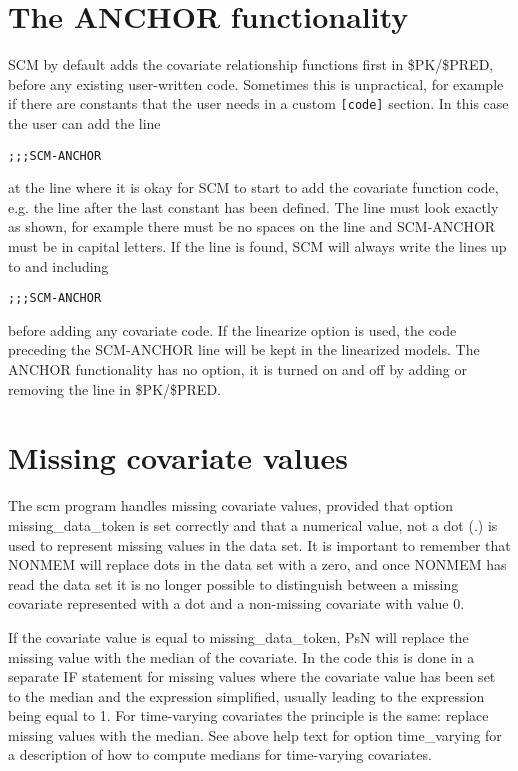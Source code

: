 \section{The ANCHOR functionality}
SCM by default adds the covariate relationship functions first in \$PK/\$PRED, before any existing user-written code. Sometimes this is unpractical, for example if there are constants that the user needs in a custom 
\verb|[code]| section. In this case the user can add the line
\begin{verbatim}
;;;SCM-ANCHOR
\end{verbatim}
at the line where it is okay for SCM to start to add the covariate function code, e.g. the line after the last constant has been defined. The line must look exactly as shown, for example there must be no spaces on the line and SCM-ANCHOR must be in capital letters. If the line is found, SCM will always write the lines up to and including 
\begin{verbatim}
;;;SCM-ANCHOR
\end{verbatim}
before adding any covariate code. If the linearize option is used, the code preceding the SCM-ANCHOR line will be kept in the linearized models. The ANCHOR functionality has no option, it is turned on and off by adding or removing the line in \$PK/\$PRED.

\section{Missing covariate values}
The scm program handles missing covariate values, provided that option missing\_data\_token is set correctly and that a numerical value, not a dot (.) is
used to represent missing values in the data set. It is important to remember that NONMEM will replace dots in the data set with a zero, and once NONMEM
has read the data set it is no longer possible to distinguish between
a missing covariate represented with a dot and a 
non-missing covariate with value 0. 

If the covariate value is equal to missing\_data\_token, PsN will replace the missing value with the median of the covariate. In the code this is done in a separate IF statement for missing values where the covariate value has been set to the median and the expression simplified, usually leading to the expression being equal to 1. For time-varying covariates the principle is the same: replace missing values with the median. See above help text for option time\_varying for a description of how to compute medians for time-varying covariates.  

